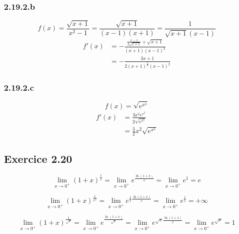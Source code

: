 \documentclass{report}
\begin{document}
\subsubsection*{2.19.2.b}
\begin{displaymath}
	f(x) = \frac{\sqrt{x+1}}{x^2-1} = \frac{\sqrt{x+1}}{(x-1)(x+1)}= \frac{1}{\sqrt{x+1}(x-1)}
\end{displaymath}
\begin{equation*}
	\begin{split}
		f'(x) &= -\frac{\frac{x-1}{2\sqrt{x+1}} + \sqrt{x+1}}{(x+1)(x-1)^2} \\
		      & = -\frac{3x+1}{2(x+1)^{\frac{3}{2}} (x-1)^2}
	\end{split}	
\end{equation*}

\subsubsection*{2.19.2.c}
\begin{displaymath}
	f(x) = \sqrt{e^{x^3}}
\end{displaymath}
\begin{equation*}
	\begin{split}
		f'(x) &= \frac{3x^2 e^{x^3}}{2\sqrt{e^{x^3}}} \\
		      &= \frac{3}{2}x^2 \sqrt{e^{x^3}}
	\end{split}	
\end{equation*}


\subsection*{Exercice 2.20}
\begin{displaymath}
	\lim_{x \rightarrow 0^{+}} (1+x)^\frac{1}{x}
		= \lim_{x \rightarrow 0^{+}} e^{\frac{\ln(1+x)}{x}}
		= \lim_{x \rightarrow 0^{+}} e^{1} 
		= e
\end{displaymath}

\begin{displaymath}
	\lim_{x \rightarrow 0^{+}} (1+x)^\frac{1}{x^2} 
		= \lim_{x \rightarrow 0^{+}} e^{\frac{1}{x}\frac{\ln(1+x)}{x}} 
		= \lim_{x \rightarrow 0^{+}} e^{\frac{1}{x}}
		= +\infty
\end{displaymath}

\begin{displaymath}
	\lim_{x \rightarrow 0^{+}} (1+x)^\frac{1}{\sqrt{x}} 
		= \lim_{x \rightarrow 0^{+}} e^{\frac{\ln(1+x)}{\sqrt{x}}} 
		= \lim_{x \rightarrow 0^{+}} e^{\sqrt{x}\frac{\ln(1+x)}{x}}
		= \lim_{x \rightarrow 0^{+}} e^{\sqrt{x}}
		= 1
\end{displaymath}
\end{document}
